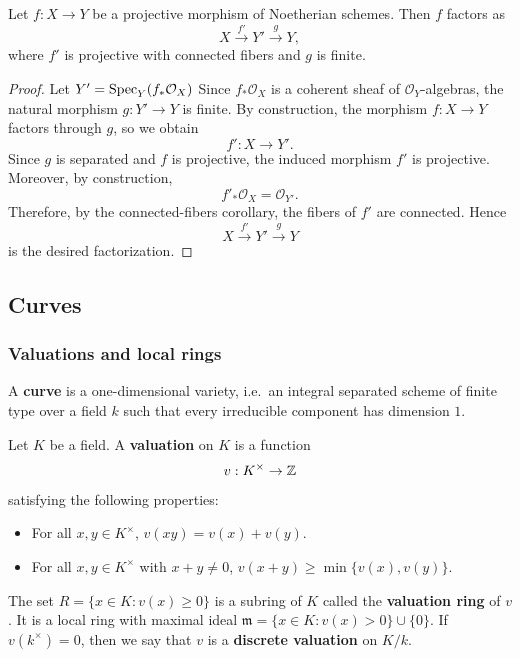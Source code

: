 \documentclass[12pt]{article}
\begin{document}
\begin{corollary}
    Let $f:X\to Y$ be a projective morphism of Noetherian schemes. Then $f$ factors as
    \[
        X\xrightarrow{f'}Y'\xrightarrow{g}Y,
    \]
    where $f'$ is projective with connected fibers and $g$ is finite.
\end{corollary}

\begin{proof}
    Let $Y'=\operatorname{Spec}_Y(f_*\mathcal O_X)$
    Since $f_*\mathcal O_X$ is a coherent sheaf of $\mathcal O_Y$-algebras, the natural morphism $g:Y'\to Y$ is finite. By construction, the morphism $f:X\to Y$ factors through $g$, so we obtain
    \[
        f':X\to Y'.
    \]
    Since $g$ is separated and $f$ is projective, the induced morphism $f'$ is projective. Moreover, by construction,
    \[
        f'_*\mathcal O_X=\mathcal O_{Y'}.
    \]
    Therefore, by the connected-fibers corollary, the fibers of $f'$ are connected. Hence
    \[
        X\xrightarrow{f'}Y'\xrightarrow{g}Y
    \]
    is the desired factorization.
\end{proof}

\subsection{Curves}
\subsubsection{Valuations and local rings}
\begin{definition}
    A \textbf{curve} is a one-dimensional variety, i.e.\ an integral separated scheme of finite type over a field $k$ such that every irreducible component has dimension $1$.
\end{definition}

\begin{definition}
    Let $K$ be a field. A \textbf{valuation} on $K$ is a function
    \[v:K^\times\to \mathbb{Z}
    \]satisfying the following properties:
    \begin{itemize}
        \item For all $x,y\in K^\times$, $v(xy)=v(x)+v(y)$.
        \item For all $x,y\in K^\times$ with $x+y\neq 0$, $v(x+y)\ge \min\{v(x),v(y)\}$.
    \end{itemize}
\end{definition}
The set $R = \{x \in K : v(x) \ge 0\}$ is a subring of $K$ called the \textbf{valuation ring} of $v$. It is a local ring with maximal ideal $\mathfrak m = \{x \in K : v(x) > 0\} \cup \{0\}$. If $v(k^\times) = 0$, then we say that $v$ is a \textbf{discrete valuation} on $K/k$.
\end{document}

